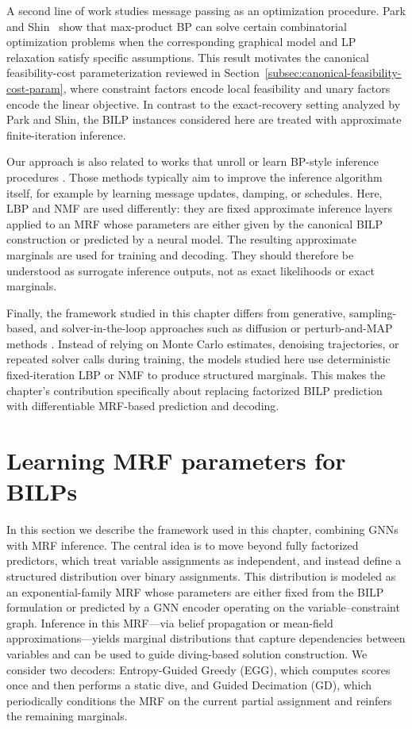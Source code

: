 A second line of work studies message passing as an optimization procedure. Park and Shin~\cite{park_max-product_2017} show that max-product BP can solve certain combinatorial optimization problems when the corresponding graphical model and LP relaxation satisfy specific assumptions. This result motivates the canonical feasibility-cost parameterization reviewed in Section~\ref{subsec:canonical-feasibility-cost-param}, where constraint factors encode local feasibility and unary factors encode the linear objective. In contrast to the exact-recovery setting analyzed by Park and Shin, the BILP instances considered here are treated with approximate finite-iteration inference.

Our approach is also related to works that unroll or learn BP-style inference procedures \cite{kuck_belief_2020,deng_deep_2022,wiseman_amortized_2019}. Those methods typically aim to improve the inference algorithm itself, for example by learning message updates, damping, or schedules. Here, LBP and NMF are used differently: they are fixed approximate inference layers applied to an MRF whose parameters are either given by the canonical BILP construction or predicted by a neural model. The resulting approximate marginals are used for training and decoding. They should therefore be understood as surrogate inference outputs, not as exact likelihoods or exact marginals.

Finally, the framework studied in this chapter differs from generative, sampling-based, and solver-in-the-loop approaches such as diffusion or perturb-and-MAP methods \cite{sun_difusco_2023,berthet_learning_2020}. Instead of relying on Monte Carlo estimates, denoising trajectories, or repeated solver calls during training, the models studied here use deterministic fixed-iteration LBP or NMF to produce structured marginals. This makes the chapter's contribution specifically about replacing factorized BILP prediction with differentiable MRF-based prediction and decoding.



\section{Learning MRF parameters for BILPs}
\label{sec:chapter_3_mrf_parameter_learning}

In this section we describe the framework used in this chapter, combining GNNs with MRF inference. The central idea is to move beyond fully factorized predictors, which treat variable assignments as independent, and instead define a structured distribution over binary assignments. This distribution is modeled as an exponential-family MRF whose parameters are either fixed from the BILP formulation or predicted by a GNN encoder operating on the variable--constraint graph. Inference in this MRF---via belief propagation or mean-field approximations---yields marginal distributions that capture dependencies between variables and can be used to guide diving-based solution construction. We consider two decoders: Entropy-Guided Greedy (EGG), which computes scores once and then performs a static dive, and Guided Decimation (GD), which periodically conditions the MRF on the current partial assignment and reinfers the remaining marginals.

